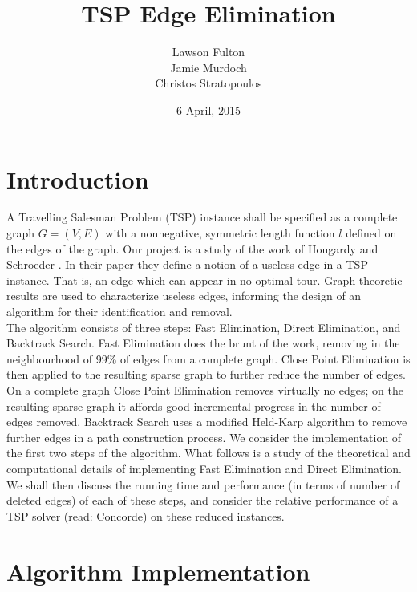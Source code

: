 \documentclass{article} \usepackage[left=2cm,top=1.5cm,right=2cm,
\DeclareRobustCommand\{{\ifmmode\lbrace\else\textbraceleft\fi}
\DeclareRobustCommand\}{\ifmmode\rbrace\else\textbraceright\fi}
\begin{document}
\title{TSP Edge Elimination} \date{6 April, 2015} \author{Lawson
  Fulton\\ Jamie Murdoch \\ Christos Stratopoulos}
\maketitle

\newpage

\tableofcontents

\newpage

\section{Introduction}

A Travelling Salesman Problem (TSP) instance shall be specified as a
complete graph $G=(V, E)$ with a nonnegative, symmetric length
function $l$ defined on the edges of the graph. Our project is a study
of the work of Hougardy and Schroeder \cite{paper}. In their paper
they define a notion of a useless edge in a TSP instance. That is, an
edge which can appear in no optimal tour. Graph theoretic results are
used to characterize useless edges, informing the design of an
algorithm for their
identification and removal. \\
The algorithm consists of three steps: Fast Elimination, Direct
Elimination, and Backtrack Search. Fast Elimination does the brunt of
the work, removing in the neighbourhood of 99\% of edges from a
complete graph. Close Point Elimination is then applied to the
resulting sparse graph to further reduce the number of edges. On a
complete graph Close Point Elimination removes virtually no edges; on
the resulting sparse graph it affords good incremental progress in the
number of edges removed. Backtrack Search uses a modified Held-Karp
algorithm to remove further edges in a path construction process. We
consider the implementation of the first two steps of the
algorithm. What follows is a study of the theoretical and
computational details of implementing Fast Elimination and Direct
Elimination. We shall then discuss the running time and performance
(in terms of number of deleted edges) of each of these steps, and
consider the relative performance of a TSP solver (read: Concorde) on
these reduced instances.

\section{Algorithm Implementation}
\end{document}
